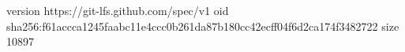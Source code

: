 version https://git-lfs.github.com/spec/v1
oid sha256:f61accca1245faabc11e4ccc0b261da87b180cc42ecff04f6d2ca174f3482722
size 10897
